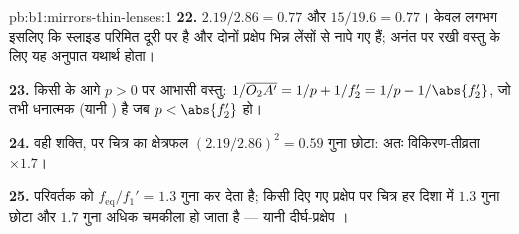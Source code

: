 \begin{solution}{pb:b1:mirrors-thin-lenses:1}
\textbf{22.} $2.19/2.86 = 0.77$ और $15/19.6 = 0.77$। केवल लगभग इसलिए
कि स्लाइड परिमित दूरी पर है और दोनों प्रक्षेप भिन्न लेंसों से नापे गए हैं;
अनंत पर रखी वस्तु के लिए यह अनुपात यथार्थ होता।

\textbf{23.} किसी  के आगे $p > 0$ पर आभासी वस्तु:
$1/\overline{O_2A'} = 1/p + 1/f_2' = 1/p - 1/\abs{f_2'}$, जो तभी धनात्मक
(यानी ) है जब $p < \abs{f_2'}$ हो।

\textbf{24.} वही शक्ति, पर चित्र का क्षेत्रफल $(2.19/2.86)^2 = 0.59$
गुना छोटा: अतः विकिरण-तीव्रता $\times 1.7$।

\textbf{25.} परिवर्तक  को
$f_{\mathrm{eq}}/f_1' = 1.3$ गुना कर देता है; किसी दिए गए प्रक्षेप पर चित्र
हर दिशा में $1.3$ गुना छोटा और $1.7$ गुना अधिक चमकीला हो जाता है --- यानी
दीर्घ-प्रक्षेप ।
\end{solution}
